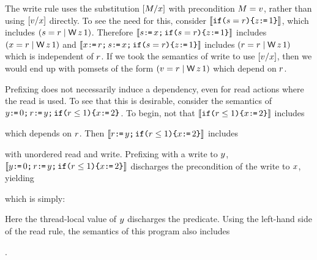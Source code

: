 The write rule uses the substitution $[M/x]$ with
precondition $M=v$, rather than using $[v/x]$ directly.
To see the need for this, consider
$\llbracket\texttt{if}\allowbreak\texttt{(}s=r\texttt{)}\allowbreak\texttt{\{} z\texttt{:}\mkern-1mu\texttt{=}\, 1\texttt{\}}\rrbracket$,
which includes
\begin{math}
(\bReg=\aReg \mid \DW\cLoc1)
\end{math}.
Therefore
$\llbracket s\texttt{:}\mkern-1mu\texttt{=}\,x\texttt{;}\,\texttt{if}\allowbreak\texttt{(}s=r\texttt{)}\allowbreak\texttt{\{} z\texttt{:}\mkern-1mu\texttt{=}\, 1\texttt{\}}\rrbracket$
includes
\begin{math}
  (\aLoc=\aReg \mid \DW\cLoc1)
\end{math}
and
$\llbracket x\texttt{:}\mkern-1mu\texttt{=}\,r\texttt{;}\,s\texttt{:}\mkern-1mu\texttt{=}\,x\texttt{;}\,\texttt{if}\allowbreak\texttt{(}s=r\texttt{)}\allowbreak\texttt{\{} z\texttt{:}\mkern-1mu\texttt{=}\, 1\texttt{\}}\rrbracket$
includes
\begin{math}
  (\aReg=\aReg \mid \DW\cLoc1)
\end{math}
which is independent of $r$.
%
If we took the semantics of write to use $[v/x]$, then we would end
up with pomsets of the form
\begin{math}
  (\aVal=\aReg \mid \DW\cLoc1)
\end{math}
which depend on $r$.

Prefixing does not necessarily induce a
dependency, even for read actions where the read is used.  To see that this
is desirable, consider  the semantics of
$y\texttt{:}\mkern-1mu\texttt{=}\,0\texttt{;}\,r\texttt{:}\mkern-1mu\texttt{=}\,y\texttt{;}\,\texttt{if}\allowbreak\texttt{(}r\leq1\texttt{)}\allowbreak\texttt{\{} x\texttt{:}\mkern-1mu\texttt{=}\, 2\texttt{\}}$.
To begin, not that 
$\llbracket\texttt{if}\allowbreak\texttt{(}r\leq1\texttt{)}\allowbreak\texttt{\{} x\texttt{:}\mkern-1mu\texttt{=}\, 2\texttt{\}}\rrbracket$ includes
\begin{tikzinline}[node distance=1em]
\end{tikzinline}
which depends on $r$.
Then $\llbracket r\texttt{:}\mkern-1mu\texttt{=}\,y\texttt{;}\,\texttt{if}\allowbreak\texttt{(}r\leq1\texttt{)}\allowbreak\texttt{\{} x\texttt{:}\mkern-1mu\texttt{=}\, 2\texttt{\}}\rrbracket$ includes
\begin{tikzdisplay}[node distance=1em]
\end{tikzdisplay}
with unordered read and write.
Prefixing with a write to $y$, $\llbracket y\texttt{:}\mkern-1mu\texttt{=}\,0\texttt{;}\,r\texttt{:}\mkern-1mu\texttt{=}\,y\texttt{;}\,\texttt{if}\allowbreak\texttt{(}r\leq1\texttt{)}\allowbreak\texttt{\{} x\texttt{:}\mkern-1mu\texttt{=}\,
  2\texttt{\}}\rrbracket$ discharges the precondition of the write to $x$, yielding
\begin{tikzinline}[node distance=1em]
\end{tikzinline}
which is simply:
\begin{tikzdisplay}[node distance=1em]
\end{tikzdisplay}
Here the thread-local value of $y$ discharges the predicate.
Using the left-hand side of the read rule, the semantics of this program also includes
\begin{tikzinline}[node distance=1em]
\end{tikzinline}.


